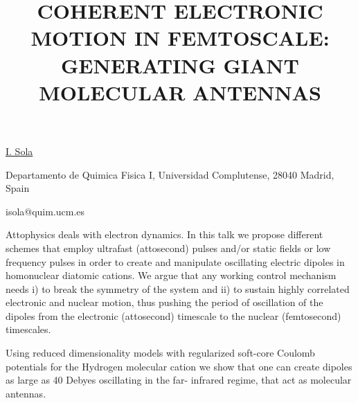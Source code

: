 \title{COHERENT ELECTRONIC MOTION IN FEMTOSCALE: GENERATING GIANT MOLECULAR ANTENNAS}

\underline{I. Sola} 

{\normalsize{
\vspace{-4mm}
Departamento de Quimica Fisica I, Universidad Complutense, 28040 Madrid, Spain

\email isola@quim.ucm.es}}

Attophysics deals with electron dynamics. In this talk we propose different schemes that employ
ultrafast (attosecond) pulses and/or static fields or low frequency pulses in order to create and
manipulate oscillating electric dipoles in homonuclear diatomic cations. We argue that any working
control mechanism needs i) to break the symmetry of the system and ii) to sustain highly correlated
electronic and nuclear motion, thus pushing the period of oscillation of the dipoles from the
electronic (attosecond) timescale to the nuclear (femtosecond) timescales.

Using reduced dimensionality models with regularized soft-core Coulomb potentials for the Hydrogen
molecular cation we show that one can create dipoles as large as 40 Debyes oscillating in the far-
infrared regime, that act as molecular antennas.

\vspace{\baselineskip}